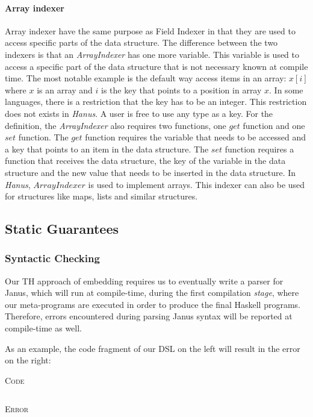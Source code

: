 \documentclass[12pt,a4paper]{article}
\newcommand{\code}[2]{
 \begin{center} \textsc{\small #1} \end{center}
 \inputminted[frame=lines,framesep=.5cm,baselinestretch=.8,linenos,fontsize=\footnotesize]
         {haskell}{code/#2.hs}
}
\newcommand{\codeErr}[1]{
 \begin{center} \textsc{\small Error} \end{center}
 \inputminted[frame=lines,framesep=.5cm,baselinestretch=.8,fontsize=\footnotesize]
         {bash}{code/#1_err.hs}
}
\begin{document}
    \paragraph{Array indexer}   
    Array indexer have the same purpose as Field Indexer in that they are used to access specific parts of the data structure. The difference between the two indexers is that an \textit{ArrayIndexer} has one more variable. This variable is used to access a specific part of the data structure that is not necessary known at compile time. The most notable example is the default way access items in an array: $x[i]$ where $x$ is an array and $i$ is the key that points to a position in array $x$. In some languages, there is a restriction that the key has to be an integer. This restriction does not exists in \textit{Hanus}. A user is free to use any type as a key. For the definition, the \textit{ArrayIndexer} also requires two functions, one $get$ function and one $set$ function. The $get$ function requires the variable that needs to be accessed and a key that points to an item in the data structure. The $set$ function requires a function that receives the data structure, the key of the variable in the data structure and the new value that needs to be inserted in the data structure. In \textit{Hanus}, $ArrayIndexer$ is used to implement arrays. This indexer can also be used for structures like maps, lists and similar structures.   

\newpage
\subsection{Static Guarantees}

\subsubsection{Syntactic Checking}
Our TH approach of embedding requires us to eventually write a parser for Janus, which will run at compile-time, during the first compilation \textit{stage}, where our meta-programs are executed in order to produce the final Haskell programs. Therefore, errors encountered during parsing Janus syntax will be reported at compile-time as well.

As an example, the code fragment of our DSL on the left will result in the error on the right:

\hspace{1cm}
\begin{minipage}{.3\textwidth}
\code{Code}{syntax}
\end{minipage}
\hspace{1cm}
\begin{minipage}{.5\textwidth}
\codeErr{syntax}
\end{minipage}
\hspace{1cm}
\end{document}
